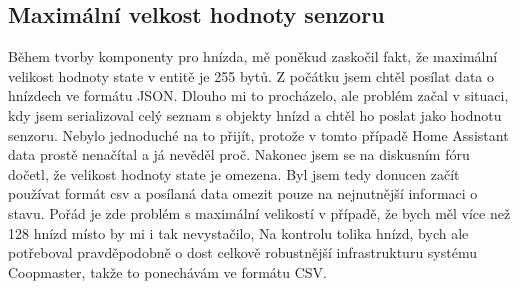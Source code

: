 \subsection*{Maximální velkost hodnoty senzoru}
Během tvorby komponenty pro hnízda, mě poněkud zaskočil fakt, že maximální velikost hodnoty state v entitě je 255 bytů.
Z počátku jsem chtěl posílat data o hnízdech ve formátu JSON.
Dlouho mi to procházelo, ale problém začal v situaci, kdy jsem serializoval celý seznam s objekty hnízd a chtěl ho poslat jako hodnotu senzoru.
Nebylo jednoduché na to přijít, protože v tomto případě Home Assistant data prostě nenačítal a já nevěděl proč.
Nakonec jsem se na diskusním fóru dočetl, že velikost hodnoty state je omezena.
Byl jsem tedy donucen začít používat formát csv a posílaná data omezit pouze na nejnutnější informaci o stavu.
Pořád je zde problém s maximální velikostí v případě, že bych měl více než 128 hnízd místo by mi i tak nevystačilo,
Na kontrolu tolika hnízd, bych ale potřeboval pravděpodobně o dost celkově robustnější infrastrukturu systému Coopmaster, takže to ponechávám ve formátu CSV.



